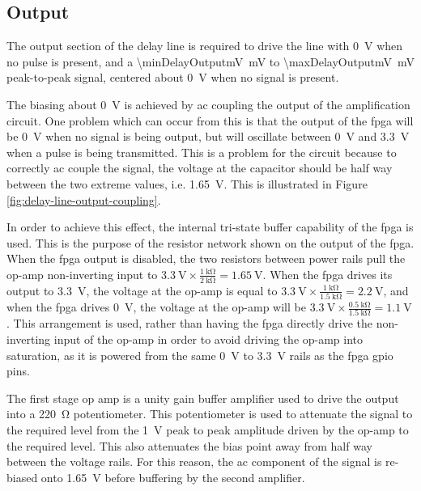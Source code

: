 \subsection{Output}

The output section of the delay line is required to drive the line with \SI{0}{\volt} when no pulse is present, and a \SI{\minDelayOutputmV}{\milli\volt} to \SI{\maxDelayOutputmV}{\milli\volt} peak-to-peak signal, centered about \SI{0}{\volt} when no signal is present.


The biasing about \SI{0}{\volt} is achieved by \gls{ac} coupling the output of the amplification circuit. One problem which can occur from this is that the output of the \gls{fpga} will be \SI{0}{\volt} when no signal is being output, but will oscillate between \SI{0}{\volt} and \SI{3.3}{\volt} when a pulse is being transmitted. This is a problem for the circuit because to correctly \gls{ac} couple the signal, the voltage at the capacitor should be half way between the two extreme values, i.e. \SI{1.65}{\volt}. This is illustrated in Figure \ref{fig:delay-line-output-coupling}.

In order to achieve this effect, the internal tri-state buffer capability of the \gls{fpga} is used. This is the purpose of the resistor network shown on the output of the \gls{fpga}. When the \gls{fpga} output is disabled, the two resistors between power rails pull the op-amp non-inverting input to $\SI{3.3}{\volt} \times\frac{\SI{1}{\kilo\ohm}}{\SI{2}{\kilo\ohm}} = \SI{1.65}{\volt}$. When the \gls{fpga} drives its output to \SI{3.3}{\volt}, the voltage at the op-amp is equal to $\SI{3.3}{\volt} \times\frac{\SI{1}{\kilo\ohm}}{\SI{1.5}{\kilo\ohm}} = \SI{2.2}{\volt}$, and when the \gls{fpga} drives \SI{0}{\volt}, the voltage at the op-amp will be $\SI{3.3}{\volt} \times\frac{\SI{0.5}{\kilo\ohm}}{\SI{1.5}{\kilo\ohm}} = \SI{1.1}{\volt}$. This arrangement is used, rather than having the \gls{fpga} directly drive the non-inverting input of the op-amp in order to avoid driving the op-amp into saturation, as it is powered from the same \SI{0}{\volt} to \SI{3.3}{\volt} rails as the \gls{fpga} \gls{gpio} pins.

The first stage op amp is a unity gain buffer amplifier used to drive the output into a \SI{220}{\ohm} potentiometer. This potentiometer is used to attenuate the signal to the required level from the \SI{1}{\volt} peak to peak amplitude driven by the op-amp to the required level. This also attenuates the bias point away from half way between the voltage rails. For this reason, the \gls{ac} component of the signal is re-biased onto \SI{1.65}{\volt} before buffering by the second amplifier.

